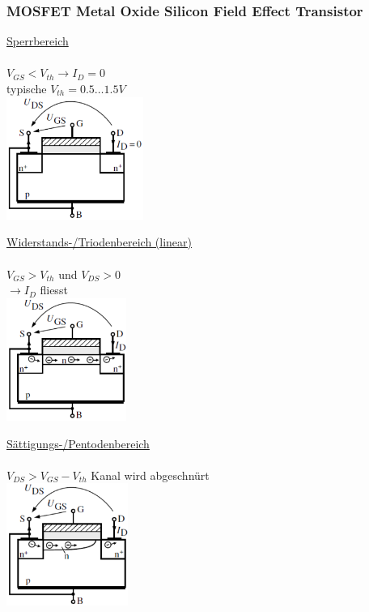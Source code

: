             \subsubsection{MOSFET Metal Oxide Silicon Field Effect Transistor}
            \begin{minipage}[T]{6cm}
                \underline{Sperrbereich}\\\\
                $V_{GS} < V_{th} \to I_D = 0$\\
                typische $V_{th} = 0.5 \dots 1.5V$\\ 
                \includegraphics[height=4cm]{./images/MOSFETSperrbereich.png}
            \end{minipage}
            \begin{minipage}[T]{6cm}
                \underline{Widerstands-/Triodenbereich (linear)}\\\\
                $V_{GS} > V_{th} $ und $V_{DS}>0$\\
                $\to I_D$ fliesst\\
                \includegraphics[height=4cm]{./images/MOSFETLinBereich.png}
            \end{minipage}
            \begin{minipage}[T]{6cm}
                \underline{S\"attigungs-/Pentodenbereich}\\\\
                $V_{DS} > V_{GS} - V_{th}$ Kanal wird abgeschnürt\\
                \includegraphics[height=4cm]{./images/MOSFETSaettBereich.png}
            \end{minipage}\\
            
